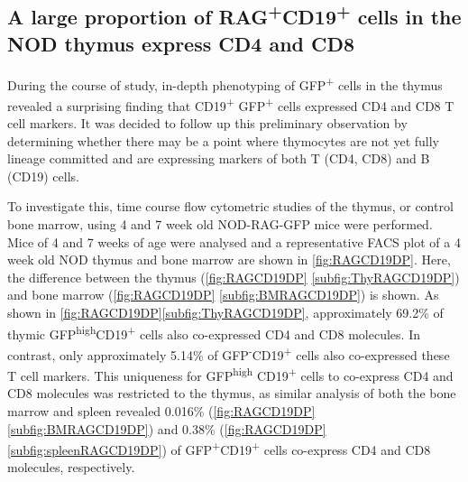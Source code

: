 \subsection{A large proportion of RAG\textsuperscript{+}CD19\textsuperscript{+} cells in the NOD thymus express CD4 and CD8}

During the course of study, in-depth phenotyping of GFP\textsuperscript{+} cells in the thymus revealed a surprising finding that CD19\textsuperscript{+} GFP\textsuperscript{+} cells expressed CD4 and CD8 T cell markers.
It was decided to follow up this preliminary observation by determining whether there may be a point where thymocytes are not yet fully lineage committed and are expressing markers of both T (CD4, CD8) and B (CD19) cells.

To investigate this, time course flow cytometric studies of the thymus, or control bone marrow, using 4 and 7 week old NOD-RAG-GFP mice were performed.
Mice of 4 and 7 weeks of age were analysed and a representative FACS plot of a 4 week old NOD thymus and bone marrow are shown in \cref{fig:RAGCD19DP}. 
Here, the difference between the thymus (\cref{fig:RAGCD19DP} \ref{subfig:ThyRAGCD19DP}) and bone marrow (\cref{fig:RAGCD19DP} \cref{subfig:BMRAGCD19DP}) is shown.
As shown in \cref{fig:RAGCD19DP}\ref{subfig:ThyRAGCD19DP}, approximately 69.2\% of thymic GFP\textsuperscript{high}CD19\textsuperscript{+} cells also co-expressed CD4 and CD8 molecules.
In contrast, only approximately 5.14\% of GFP\textsuperscript{-}CD19\textsuperscript{+} cells also co-expressed these T cell markers.
This uniqueness for GFP\textsuperscript{high} CD19\textsuperscript{+} cells to co-express CD4 and CD8 molecules was restricted to the thymus, as similar analysis of both the bone marrow and spleen revealed 0.016\% (\cref{fig:RAGCD19DP} \ref{subfig:BMRAGCD19DP}) and 0.38\% (\cref{fig:RAGCD19DP} \ref{subfig:spleenRAGCD19DP}) of GFP\textsuperscript{+}CD19\textsuperscript{+} cells co-express CD4 and CD8 molecules, respectively.



